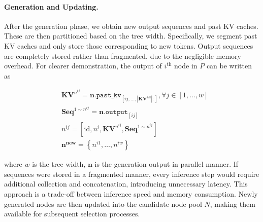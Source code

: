 \paragraph{Generation and Updating.} After the generation phase, we obtain new output sequences and past KV caches. These are then partitioned based on the tree width. Specifically, we segment past KV caches and only store those corresponding to new tokens. Output sequences are completely stored rather than fragmented, due to the negligible memory overhead. For clearer demonstration, the output of $i^\mathrm{th}$ node in $P$ can be written as 
\begin{center}
\begin{equation}
\label{eq:n_new}
\begin{split}
    & \mathbf{KV}^{n^{ij}} = \mathbf{n}.\mathtt{past\_kv}_{[ij, \dots, |\mathbf{KV}^{\text{all}}|:]}, \forall j \in \left[1, \dots, w\right] \\
    & \mathbf{Seq}^{1 \sim n^{ij}} = \mathbf{n}.\mathtt{output}_{[ij]} \\
    & n^{ij} = \left[\mathrm{id}, n^i, \mathbf{KV}^{n^{ij}}, \mathbf{Seq}^{1 \sim n^{ij}}\right] \\
    & \mathbf{n^{new}} = \left\{ n^{i1}, \dots, n^{iw} \right\}
\end{split}
\end{equation}
\end{center}
where $w$ is the tree width, $\mathbf{n}$ is the generation output in parallel manner. 
If sequences were stored in a fragmented manner, every inference step would require additional collection and concatenation, introducing unnecessary latency.  This approach is a trade-off between inference speed and memory consumption. 
Newly generated nodes are then updated into the candidate node pool $N$, making them available for subsequent selection processes.



